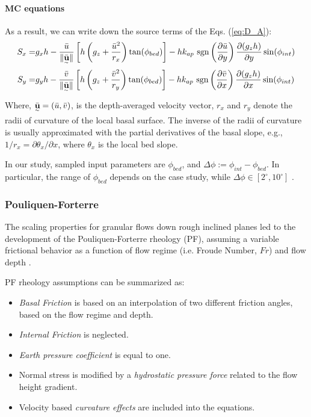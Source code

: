 \documentclass{article}
\begin{document}
\paragraph{MC equations} As a result, we can write down the source terms of the Eqs. (\ref{eq:D_A}):
\begin{eqnarray}\label{S_terms_MC}
S_x =& g_x h  - \frac{\bar{u}}{\| \underset{^\sim}{\bar{\textbf u}} \|} \left[h\left(g_z+\frac{\bar{u}^2}{r_x}\right)\tan(\phi_{bed})\right] - h k_{ap} \ {\rm sgn}\left(\frac{\partial \bar{u}}{\partial y}\right) \frac{\partial (g_z h)}{\partial y} \sin(\phi_{int}) \nonumber \\
 S_y =& g_y h  - \frac{\bar{v}}{\| \underset{^\sim}{\bar{\textbf u}} \|} \left[h\left(g_z +\frac{\bar{v}^2}{r_y}\right)\tan(\phi_{bed})\right] - h k_{ap} \ {\rm sgn}\left({\frac{\partial \bar{v}}{\partial x}}\right) \frac{\partial (g_z h)}{\partial x} \sin(\phi_{int})
\end{eqnarray}
Where, $\underset{^\sim}{\bar{\textbf u}} = (\bar{u} , \bar{v})$, is the depth-averaged velocity vector, $r_x$ and $r_y$ denote the radii of curvature
of the local basal surface. The inverse of the radii of curvature is usually approximated with the partial derivatives of the basal slope, e.g., $1/r_x = \partial \theta_x/\partial x$, where $\theta_x$ is the local bed slope.

In our study, sampled input parameters are $\phi_{bed}$, and $\Delta \phi:=\phi_{int}-\phi_{bed}$. In particular, the range of $\phi_{bed}$ depends on the case study, while $\Delta \phi \in [2^{\mathrm{\circ}}, 10^{\mathrm{\circ}}]$ \citep{Dalbey2008}.

\subsubsection{Pouliquen-Forterre}\label{PFM}
The scaling properties for granular flows down rough inclined planes led to the development of the Pouliquen-Forterre rheology (PF), assuming a variable frictional behavior as a function of flow regime (i.e. Froude Number, $Fr$) and flow depth \citep{Pouliquen1999, ForterrePouliquen2002, PouliquenForterre2002, ForterrePouliquen2003}.

PF rheology assumptions can be summarized as:
\begin{itemize}
\item \textit{Basal Friction} is based on an interpolation of two different friction angles, based on the flow regime and depth.

\item \textit{Internal Friction} is neglected.

\item \textit{Earth pressure coefficient} is equal to one.

\item Normal stress is modified by a \textit{hydrostatic pressure force} related to the flow height gradient.

\item Velocity based \textit{curvature effects} are included into the equations.
\end{itemize}
\end{document}
